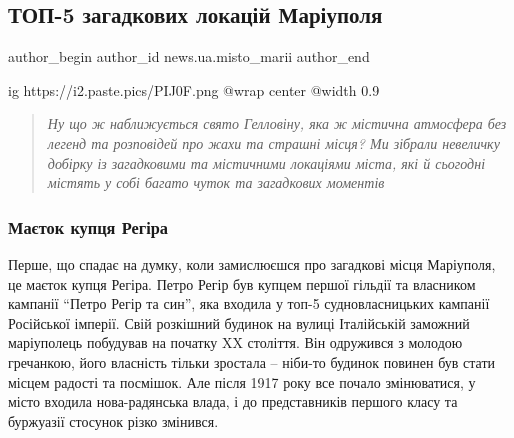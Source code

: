  
 
 
 
 
 
\subsection{ТОП-5 загадкових локацій Маріуполя}
\label{sec:29_10_2021.stz.news.ua.misto_marii.1.top_5_zagadkovyh_lokacij_mariupolja}
 
\ifcmt
 author_begin
   author_id news.ua.misto_marii
 author_end
\fi

\ifcmt
  ig https://i2.paste.pics/PIJ0F.png
  @wrap center
  @width 0.9
\fi

\begin{quote}
\em
Ну що ж наближується свято Гелловіну, яка ж містична атмосфера без легенд та
розповідей про жахи та страшні місця? Ми зібрали невеличку добірку із
загадковими та містичними локаціями міста, які й сьогодні містять у собі багато
чуток та загадкових моментів
\end{quote}

\subsubsection{Маєток купця Регіра}


Перше, що спадає на думку, коли замислюєшся про загадкові місця Маріуполя, це
маєток купця Регіра. Петро Регір був купцем першої гільдії та власником
кампанії \enquote{Петро Регір та син}, яка входила у топ-5 судновласницьких
кампанії Російської імперії. Свій розкішний будинок на вулиці Італійській
заможний маріуполець побудував на початку XX століття. Він одружився з молодою
гречанкою, його власність тільки зростала – ніби-то будинок повинен був стати
місцем радості та посмішок. Але після 1917 року все почало змінюватися, у місто
входила нова-радянська влада, і до представників першого класу та буржуазії
стосунок різко змінився.

